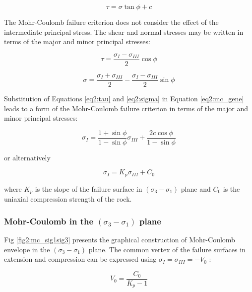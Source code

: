 \begin{equation}\label{eq2:mc_gene}
    \tau = \sigma \tan \phi + c
\end{equation}

The Mohr-Coulomb failure criterion does not consider the effect of the intermediate principal stress. The shear and normal stresses may be written in terms of the major and minor principal stresses: 

\begin{equation}\label{eq2:tau}
    \tau = \frac{\sigma_I - \sigma_{III}}{2} \cos \phi
\end{equation}

\begin{equation}\label{eq2:sigma}
    \sigma = \frac{\sigma_I + \sigma_{III}}{2} - \frac{\sigma_I - \sigma_{III}}{2} \sin \phi
\end{equation}

Substitution of Equations \ref{eq2:tau} and \ref{eq2:sigma} in Equation \ref{eq2:mc_gene} leads to a form of the Mohr-Coulomb failure criterion in terms of the major and minor principal stresses:

\begin{equation} \label{eq2:MCfinalform}
    \sigma_{I}=\frac{1+\sin \phi}{1-\sin \phi} \sigma_{I I I}+\frac{2 c \cos \phi}{1-\sin \phi}
\end{equation}

or alternatively

\begin{equation}\label{eq2:MCcondenseform}
    \sigma_I = K_p \sigma_{III} + C_0
\end{equation}

where $K_p$ is the slope of the failure surface in $(\sigma_3 -\sigma_1)$ plane and $C_0$ is the uniaxial compression strength of the rock. 

\subsubsection{Mohr-Coulomb in the \texorpdfstring{$(\sigma_3 -\sigma_1)$}{sigma 3 - sigma 1} plane}

Fig \ref{fig2:mc_sig1sig3} presents the graphical construction of Mohr-Coulomb envelope in the $(\sigma_3 -\sigma_1)$ plane. The common vertex of the failure surfaces in extension and compression can be expressed using $\sigma_I = \sigma_{III} = -V_0$ :

\begin{equation}\label{eq2:MC_Vo}
    V_0 = \frac{C_0}{K_p-1}
\end{equation}


